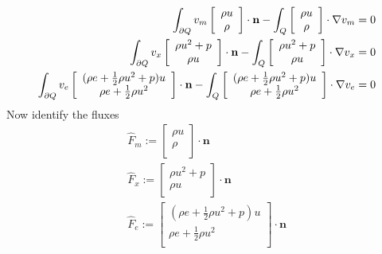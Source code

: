 \documentclass{article}
\begin{document}
\begin{align*}
\int_{\partial Q}v_m
\left[
\begin{array}{c}
   \rho u\\
   \rho\\
\end{array}
\right]
\cdot\mathbf{n}
-
\int_Q
\left[
\begin{array}{c}
   \rho u\\
   \rho\\
\end{array}
\right]
\cdot\nabla v_m
&=0\\
\int_{\partial Q}v_x
\left[
\begin{array}{c}
   \rho u^2+p\\
   \rho u\\
\end{array}
\right]
\cdot\mathbf{n}
-
\int_Q
\left[
\begin{array}{c}
   \rho u^2+p\\
   \rho u\\
\end{array}
\right]
\cdot\nabla v_x
&=0\\
\int_{\partial Q}v_e
\left[
\begin{array}{c}
   (\rho e + \frac{1}{2}\rho u^2 + p)u\\
   \rho e + \frac{1}{2}\rho u^2\\
\end{array}
\right]
\cdot\mathbf{n}
-
\int_Q
\left[
\begin{array}{c}
   (\rho e + \frac{1}{2}\rho u^2 + p)u\\
   \rho e + \frac{1}{2}\rho u^2\\
\end{array}
\right]
\cdot\nabla v_e
&=0
\end{align*}
Now identify the fluxes
\begin{align*}
\hat F_m:=
\left[
\begin{array}{c}
   \rho u\\
   \rho\\
\end{array}
\right]
\cdot\mathbf{n}\\
\hat F_x:=
\left[
\begin{array}{c}
   \rho u^2+p\\
   \rho u\\
\end{array}
\right]
\cdot\mathbf{n}\\
\hat F_e:=
\left[
\begin{array}{c}
   (\rho e + \frac{1}{2}\rho u^2 + p)u\\
   \rho e + \frac{1}{2}\rho u^2\\
\end{array}
\right]
\cdot\mathbf{n}\\
\end{align*}
\end{document}
